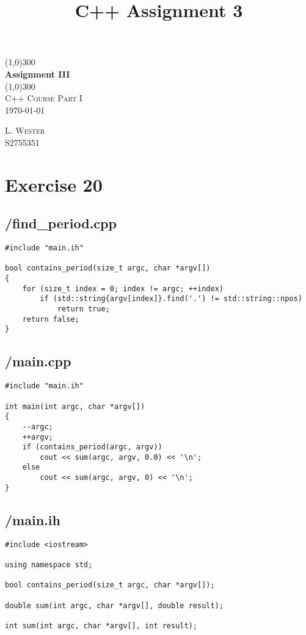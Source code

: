 \documentclass{article}
\title{C++ Assignment 3}
\begin{document}
\begin{titlepage}
    \begin{center}
        \line(1,0){300}\\
        [0.65cm]
        \huge{\bfseries Assignment III}\\
        \line(1,0){300}\\
        \textsc{\Large C++ Course Part I}\\
        \textsc{\LARGE \today}\\
        [5.5cm]     
    \end{center}
    \begin{flushright}
        \textsc{\Large L. Wester\\S2755351}\\
        [0.5cm]
    \end{flushright}
\end{titlepage}
\section*{Exercise 20}
\subsection*{/find\_period.cpp}
\begin{verbatim}
#include "main.ih"

bool contains_period(size_t argc, char *argv[])
{
    for (size_t index = 0; index != argc; ++index)
        if (std::string{argv[index]}.find('.') != std::string::npos)
            return true;
    return false;
}
\end{verbatim}
\subsection*{/main.cpp}
\begin{verbatim}
#include "main.ih"

int main(int argc, char *argv[])
{
    --argc;
    ++argv;
    if (contains_period(argc, argv))
        cout << sum(argc, argv, 0.0) << '\n';
    else
        cout << sum(argc, argv, 0) << '\n';
}

\end{verbatim}
\subsection*{/main.ih}
\begin{verbatim}
#include <iostream>

using namespace std;

bool contains_period(size_t argc, char *argv[]);

double sum(int argc, char *argv[], double result);

int sum(int argc, char *argv[], int result);

\end{verbatim}
\end{document}
